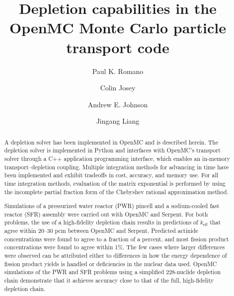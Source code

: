 \documentclass[3p,authoryear]{elsarticle}
\begin{document}
\title{Depletion capabilities in the OpenMC Monte Carlo particle transport code}

\author[anl]{Paul K. Romano}

\author[lanl]{Colin Josey}

\author[gatech]{Andrew E. Johnson}

\author[tsinghua]{Jingang Liang}

\address[anl]{Argonne National Laboratory, 9700 S. Cass Ave, Lemont, IL 60439, United States}
\address[lanl]{Los Alamos National Laboratory, P.O. Box 1663, Los Alamos, NM 87545, United States}
\address[gatech]{Georgia Institute of Technology, 770 State St. NW, Atlanta, GA 30318, United States}
\address[tsinghua]{Institute of Nuclear and New Energy Technology, Tsinghua University, Beijing, China}

\begin{abstract}
  A depletion solver has been implemented in OpenMC and is described herein. The
  depletion solver is implemented in Python and interfaces with OpenMC's
  transport solver through a C++ application programming interface, which
  enables an in-memory transport--depletion coupling. Multiple integration
  methods for advancing in time have been implemented and exhibit tradeoffs in
  cost, accuracy, and memory use. For all time integration methods, evaluation
  of the matrix exponential is performed by using the incomplete partial
  fraction form of the Chebyshev rational approximation method.

  Simulations of a pressurized water reactor (PWR) pincell and a sodium-cooled
  fast reactor (SFR) assembly were carried out with OpenMC and Serpent. For both
  problems, the use of a high-fidelity depletion chain results in predictions of
  $k_\text{eff}$ that agree within 20--30 pcm between OpenMC and Serpent.
  Predicted actinide concentrations were found to agree to a fraction of a
  percent, and most fission product concentrations were found to agree within
  1\%. The few cases where larger differences were observed can be attributed
  either to differences in how the energy dependence of fission product yields
  is handled or deficiencies in the nuclear data used. OpenMC simulations of the
  PWR and SFR problems using a simplified 228-nuclide depletion chain
  demonstrate that it achieves accuracy close to that of the full, high-fidelity
  depletion chain.
\end{abstract}
\end{document}
